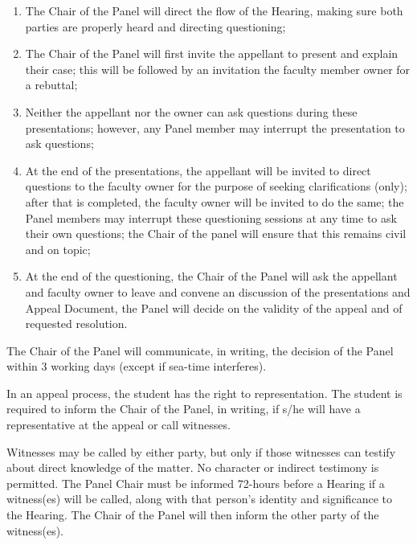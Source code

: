 \begin{enumerate}

\item The Chair of the Panel will direct the flow of the Hearing, making sure
    both parties are properly heard\add{,} and directing questioning;

\item The Chair of the Panel will first invite the appellant to present and
    explain their case; this will be followed by an invitation 
     the faculty member owner for a rebuttal;

\item Neither the appellant nor the owner can ask questions during these
    presentations; however, any Panel member may interrupt the presentation to
    ask questions;

\item At the end of the presentations, the appellant will be invited to direct
questions to the faculty owner for the purpose of seeking clarifications
(only); after that is completed, the faculty owner will be invited to do the
same;  the Panel members may interrupt these questioning sessions at any
time to ask their own questions; the Chair of the panel will ensure that this
 remains civil and on topic;

\item At the end of the questioning, the Chair of the Panel will ask the
    appellant and faculty owner to leave and convene an 
     discussion of the presentations and Appeal Document,
    the Panel will decide on the validity of the appeal and of requested
    resolution.

\end{enumerate}

 The Chair of the Panel will communicate, in writing, the decision of
the Panel within 3 working days (except if sea-time interferes).  

 In an appeal process, the student has the right to representation.
The student is required to inform the Chair of the Panel, in writing, if s/he
will have a representative at the appeal\add{,} or  call
witnesses. 

 Witnesses may be called by either party, but only if those witnesses
can testify about direct knowledge of the matter.  No character or indirect
testimony is permitted.  The Panel Chair must be informed 72-hours before a
Hearing if a witness(es) will be called, along with that person's identity and
significance to the Hearing.  The Chair of the Panel will then inform the other
party of the witness(es).  

